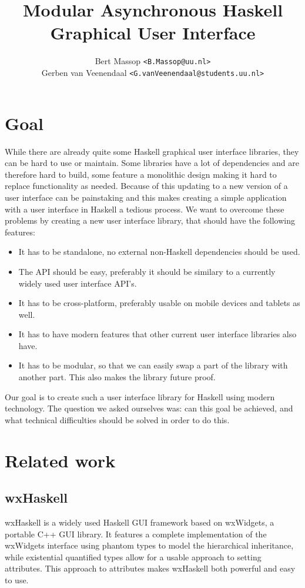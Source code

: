 \documentclass[11pt,a4paper]{article}
\title{Modular Asynchronous Haskell Graphical User Interface}
\author{Bert Massop \texttt{<B.Massop@uu.nl>}\\
Gerben van Veenendaal \texttt{<G.vanVeenendaal@students.uu.nl>}}
\begin{document}
\maketitle

\newpage
\tableofcontents

\newpage
\section{Goal}

While there are already quite some Haskell graphical user interface libraries, they can be hard to use or maintain.
Some libraries have a lot of dependencies and are therefore hard to build, some feature a monolithic design making it hard to replace functionality as needed.
Because of this updating to a new version of a user interface can be painstaking and this makes creating a simple application with a user interface in Haskell a tedious process.
We want to overcome these problems by creating a new user interface library, that should have the following features:

\begin{itemize}
\item It has to be standalone, no external non-Haskell dependencies should be used.
\item The API should be easy, preferably it should be similary to a currently widely used user interface API's.
\item It has to be cross-platform, preferably usable on mobile devices and tablets as well.
\item It has to have modern features that other current user interface libraries also have.
\item It has to be modular, so that we can easily swap a part of the library with another part.
This also makes the library future proof.
\end{itemize}

Our goal is to create such a user interface library for Haskell using modern technology.
The question we asked ourselves was: can this goal be achieved, and what technical difficulties should be solved in order to do this.

\section{Related work}
\subsection{wxHaskell}
wxHaskell is a widely used Haskell GUI framework based on wxWidgets, a portable C++ GUI library.
It features a complete implementation of the wxWidgets interface using phantom types to model the hierarchical inheritance, while existential quantified types allow for a usable approach to setting attributes.\cite{leijen2004wxhaskell}
This approach to attributes makes wxHaskell both powerful and easy to use.
\end{document}
